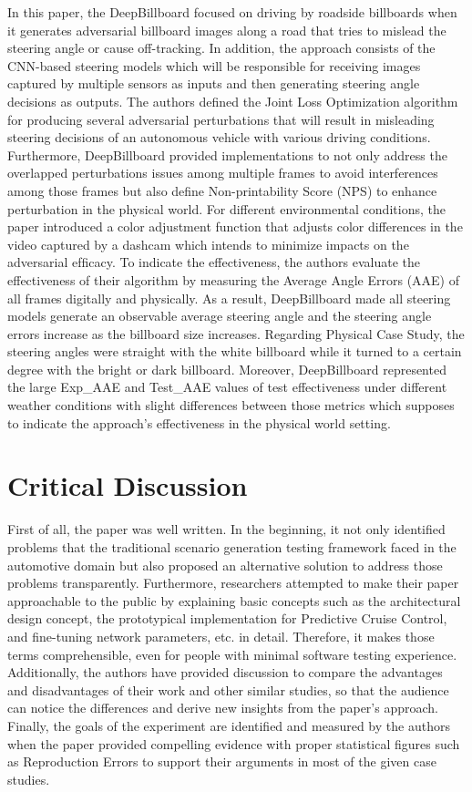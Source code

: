 \documentclass[10pt,a4paper]{report}
\begin{document}
In this paper, the DeepBillboard focused on driving by roadside billboards when it generates adversarial billboard images along a road that tries to mislead the steering angle or cause off-tracking.
%
In addition, the approach consists of the CNN-based steering models which will be responsible for receiving images captured by multiple sensors as inputs and then generating steering angle decisions as outputs.
%
The authors defined the Joint Loss Optimization algorithm for producing several adversarial perturbations that will result in misleading steering decisions of an autonomous vehicle with various driving conditions.
%
Furthermore, DeepBillboard provided implementations to not only address the overlapped perturbations issues among multiple frames to avoid interferences among those frames but also define Non-printability Score (NPS) to enhance perturbation in the physical world.
%
For different environmental conditions, the paper introduced a color adjustment function that adjusts color differences in the video captured by a dashcam which intends to minimize impacts on the adversarial efﬁcacy.
%
To indicate the effectiveness, the authors evaluate the effectiveness of their algorithm by measuring the Average Angle Errors (AAE) of all frames digitally and physically.
%
As a result, DeepBillboard made all steering models generate an observable average steering angle and the steering angle errors increase as the billboard size increases.
%
Regarding Physical Case Study, the steering angles were straight with the white billboard while it turned to a certain degree with the bright or dark billboard.
%
Moreover, DeepBillboard represented the large Exp\_AAE and Test\_AAE values of test effectiveness under different weather conditions with slight differences between those metrics which supposes to indicate the approach’s effectiveness in the physical world setting.


\section{Critical Discussion}
First of all, the paper was well written. In the beginning, it not only identified problems that the traditional scenario generation testing framework faced in the automotive domain but also proposed an alternative solution to address those problems transparently.
%
Furthermore, researchers attempted to make their paper approachable to the public by explaining basic concepts such as the architectural design concept, the prototypical implementation for Predictive Cruise Control, and fine-tuning network parameters, etc. in detail. Therefore, it makes those terms comprehensible, even for people with minimal software testing experience.
%
Additionally, the authors have provided discussion to compare the advantages and disadvantages of their work and other similar studies, so that the audience can notice the differences and derive new insights from the paper's approach.
%
Finally, the goals of the experiment are identified and measured by the authors when the paper provided compelling evidence with proper statistical figures such as Reproduction Errors to support their arguments in most of the given case studies.
%
\end{document}
